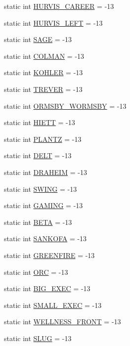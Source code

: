 \begin{DoxyCompactItemize}
\item 
static int \hyperlink{class_location_def_aa5bc4b2c20acf15679f82c46b7b08255}{H\+U\+R\+V\+I\+S\+\_\+\+C\+A\+R\+E\+E\+R} = -\/13
\item 
static int \hyperlink{class_location_def_aca37cd3cfd9b23992f9cf794378038f9}{H\+U\+R\+V\+I\+S\+\_\+\+L\+E\+F\+T} = -\/13
\item 
static int \hyperlink{class_location_def_ae759abd2d1db2d7d2e2a409462c1898e}{S\+A\+G\+E} = -\/13
\item 
static int \hyperlink{class_location_def_acf53275f6a9dbec647ee7016c9123db2}{C\+O\+L\+M\+A\+N} = -\/13
\item 
static int \hyperlink{class_location_def_a32fc789360d8ad014df1c81b70ba8570}{K\+O\+H\+L\+E\+R} = -\/13
\item 
static int \hyperlink{class_location_def_ae4d2aa44a30938fcf7372e2d6688e674}{T\+R\+E\+V\+E\+R} = -\/13
\item 
static int \hyperlink{class_location_def_afd2ed82234bb3d99f1a8b0581bf8f093}{O\+R\+M\+S\+B\+Y\+\_\+\+W\+O\+R\+M\+S\+B\+Y} = -\/13
\item 
static int \hyperlink{class_location_def_a577b33196e04e003ed6745e11cd5aa5b}{H\+I\+E\+T\+T} = -\/13
\item 
static int \hyperlink{class_location_def_aac35f030f3db3b6526b59fc33ac6c7b0}{P\+L\+A\+N\+T\+Z} = -\/13
\item 
static int \hyperlink{class_location_def_a3fcb538ca38b9226d39ba6b14c1a5727}{D\+E\+L\+T} = -\/13
\item 
static int \hyperlink{class_location_def_a076847e217a0de476bbcd8be43550f37}{D\+R\+A\+H\+E\+I\+M} = -\/13
\item 
static int \hyperlink{class_location_def_a6ef5b8cb092d555eb920ae52aebcf7fb}{S\+W\+I\+N\+G} = -\/13
\item 
static int \hyperlink{class_location_def_a2231412a7a0356c6b093cb87b755ca19}{G\+A\+M\+I\+N\+G} = -\/13
\item 
static int \hyperlink{class_location_def_af4c40d736c3c509c5c89ca4a7c94ecef}{B\+E\+T\+A} = -\/13
\item 
static int \hyperlink{class_location_def_a43665a9eb127f699287615e5e1341462}{S\+A\+N\+K\+O\+F\+A} = -\/13
\item 
static int \hyperlink{class_location_def_a0fd3ebc71e8ed8e49b1211ad21d30257}{G\+R\+E\+E\+N\+F\+I\+R\+E} = -\/13
\item 
static int \hyperlink{class_location_def_a98c61a1d89e0a21fc2d5d2659c041fea}{O\+R\+C} = -\/13
\item 
static int \hyperlink{class_location_def_a45b7e776465e77884602b8cfcd0d03fc}{B\+I\+G\+\_\+\+E\+X\+E\+C} = -\/13
\item 
static int \hyperlink{class_location_def_a8240b76378649085d3f62d8f8c397392}{S\+M\+A\+L\+L\+\_\+\+E\+X\+E\+C} = -\/13
\item 
static int \hyperlink{class_location_def_aa647c9698ed81cb1188d541fd19dc766}{W\+E\+L\+L\+N\+E\+S\+S\+\_\+\+F\+R\+O\+N\+T} = -\/13
\item 
static int \hyperlink{class_location_def_a421db14d3d715986418326d5bf399031}{S\+L\+U\+G} = -\/13
\end{DoxyCompactItemize}


